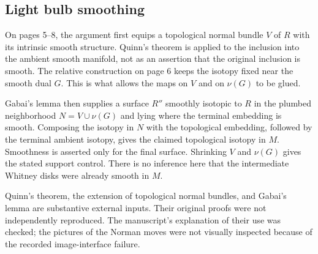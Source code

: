 \documentclass[10pt]{article}
\begin{document}
\subsection*{Light bulb smoothing}
On pages 5–8, the argument first equips a topological normal bundle \(V\) of \(R\) with its intrinsic smooth structure. Quinn’s theorem is applied to the inclusion into the ambient smooth manifold, not as an assertion that the original inclusion is smooth. The relative construction on page 6 keeps the isotopy fixed near the smooth dual \(G\). This is what allows the maps on \(V\) and on \(\nu(G)\) to be glued.\par
Gabai’s lemma then supplies a surface \(R''\) smoothly isotopic to \(R\) in the plumbed neighborhood \(N=V\cup\nu(G)\) and lying where the terminal embedding is smooth. Composing the isotopy in \(N\) with the topological embedding, followed by the terminal ambient isotopy, gives the claimed topological isotopy in \(M\). Smoothness is asserted only for the final surface. Shrinking \(V\) and \(\nu(G)\) gives the stated support control. There is no inference here that the intermediate Whitney disks were already smooth in \(M\).\par
Quinn’s theorem, the extension of topological normal bundles, and Gabai’s lemma are substantive external inputs. Their original proofs were not independently reproduced. The manuscript’s explanation of their use was checked; the pictures of the Norman moves were not visually inspected because of the recorded image-interface failure.\par
\end{document}
